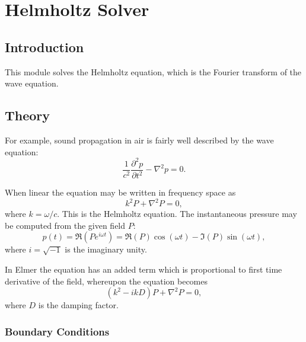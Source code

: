 \chapter{Helmholtz Solver}

\begin{versiona}

\section{Introduction}

This module solves the Helmholtz equation, which is the Fourier transform
of the wave equation. 

\section{Theory}

For example, sound propagation in air is fairly well described by the
wave equation:
\begin{equation}
\frac{1}{c^2}\frac{\partial^2 p}{\partial t^2} - \nabla^2p  = 0.
\end{equation}

When linear the equation may be written in frequency space as
\begin{equation}
k^2 P + \nabla^2P  = 0,
\end{equation}
where $k=\omega/c$.
This is the Helmholtz equation.
The instantaneous pressure may be computed
from the given field $P$:
\begin{equation}
p(t) = \Re(P e^{i\omega t}) = \Re(P)\cos(\omega t) - \Im(P)\sin(\omega t),
\end{equation}
where $i=\sqrt{-1}$ is the imaginary unity.

In Elmer  the equation has an added term which is proportional
to first time derivative of the field, whereupon the equation becomes
\begin{equation}
(k^2 - ikD)P + \nabla^2P  = 0,
\label{eq-sdamp}
\end{equation}
where $D$ is the damping factor.


\subsection{Boundary Conditions}


\end{versiona}
